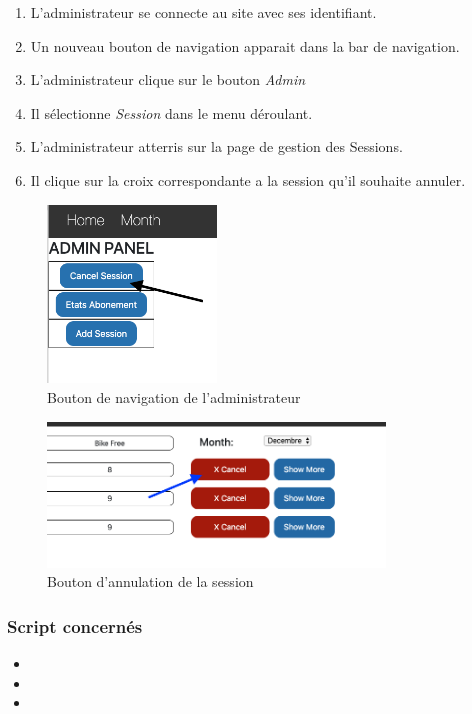 \begin{enumerate}
	\item L'administrateur se connecte au site avec ses identifiant. 
	\item Un nouveau bouton de navigation apparait dans la bar de navigation. 
	\item L'administrateur clique sur le bouton \textit{Admin}
	\item Il sélectionne \textit{Session} dans le menu déroulant. 
	\item L'administrateur atterris sur la page de gestion des Sessions. 
	\item Il clique sur la croix correspondante a la session qu'il souhaite annuler. 
\end{enumerate}

\newpage
\begin{figure}[h]
	\includegraphics[width=0.4\textwidth,center]{Figures/us9-1}
	\caption{Bouton de navigation de l'administrateur}
\end{figure}

\vspace{\baselineskip}
\begin{figure}[h]
	\includegraphics[width=0.8\textwidth,center]{Figures/us9-2}
	\caption{Bouton d'annulation de la session}
\end{figure}


\vspace{\baselineskip}
\subsubsection{Script concernés}
	\begin{itemize}
		\item {}
		\item {}
		\item {}
	\end{itemize}
